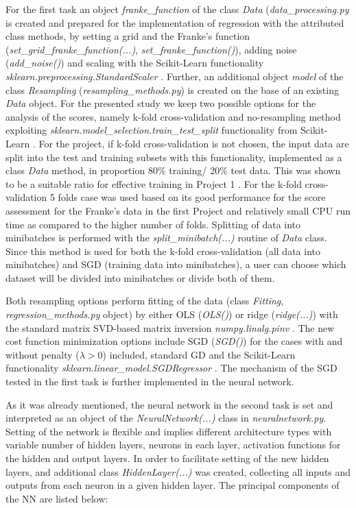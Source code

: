 \documentclass{emulateapj}
\begin{document}
For the first task an object \textit{franke\_function} of the class \textit{Data} (\textit{data\_processing.py} is created and prepared for the implementation of regression with the attributed class methods,  by setting a grid and the Franke's function (\textit{set\_grid\_franke\_function(...)}, \textit{set\_franke\_function()}), adding noise (\textit{add\_noise()}) and scaling with the Scikit-Learn functionality \textit{sklearn.preprocessing.StandardScaler} \cite{skl}. Further, an additional object \textit{model} of the class \textit{Resampling} (\textit{resampling\_methods.py}) is created on the base of an existing \textit{Data} object. For the presented study we keep two possible options for the analysis of the scores, namely k-fold cross-validation and no-resampling method exploiting \textit{sklearn.model\_selection.train\_test\_split} functionality from Scikit-Learn \cite{skl}. For the project, if k-fold cross-validation is not chosen, the input data are split into the test and training subsets with this functionality, implemented as a class \textit{Data} method, in proportion  80\% training/ 20\% test data. This was shown to be a suitable ratio for effective training in Project 1 \cite{proj1}. For the k-fold cross-validation 5 folds case was used based on its good performance for the score assessment for the Franke's data in the first Project \cite{proj1,proj1_2} and relatively small CPU run time as compared to the higher number of folds. Splitting of data into minibatches is performed with the \textit{split\_minibatch(...)} routine of \textit{Data} class. Since this method is used for both the k-fold cross-validation (all data into minibatches) and SGD (training data into minibatches), a user can choose which dataset will be divided into minibatches or divide both of them. 

Both resampling options perform fitting of the data (class \textit{Fitting}, \textit{regression\_methods.py} object) by either OLS (\textit{OLS()}) or ridge (\textit{ridge(...)}) with the standard matrix SVD-based matrix inversion \textit{numpy.linalg.pinv} \cite{numpy}. The new cost function minimization options include SGD (\textit{SGD()}) for the cases with and without penalty ($\lambda>0$) included, standard GD and the Scikit-Learn functionality \textit{sklearn.linear\_model.SGDRegressor} \cite{skl}. The mechanism of the SGD tested in the first task is further implemented in the neural network.


As it was already mentioned, the neural network in the second task is set and interpreted as an object of the \textit{NeuralNetwork(...)} class in \textit{neuralnetwork.py}. Setting of the network is flexible and implies different architecture types with variable number of hidden layers, neurons in each layer, activation functions for the hidden and output layers. In order to facilitate setting of the new hidden layers, and additional class \textit{HiddenLayer(...)} was created, collecting all inputs and outputs from each neuron in a given hidden layer. The principal components of the NN are listed below:
\end{document}
